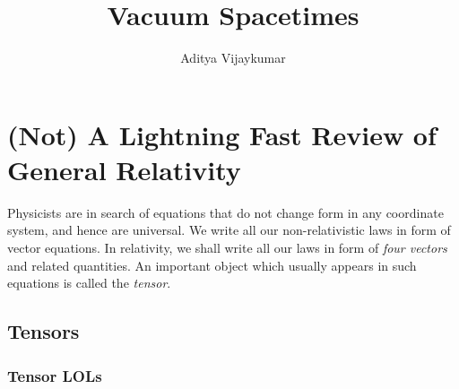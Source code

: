 \documentclass[a4paper,11pt]{article}
\title{\textbf{Vacuum Spacetimes}}
\author{Aditya Vijaykumar}
\affiliation{International Centre for Theoretical Sciences, Bengaluru, India.}
\begin{document}
\maketitle
\section{(Not) A Lightning Fast Review of General Relativity}

Physicists are in search of equations that do not change form in any coordinate system, and hence are universal. We write all our non-relativistic laws in form of vector equations. In relativity, we shall write all our laws in form of \textit{four vectors} and related quantities. An important object which usually appears in such equations is called the \textit{tensor}.

\subsection{Tensors}
\subsubsection{Tensor LOLs}
\end{document}
